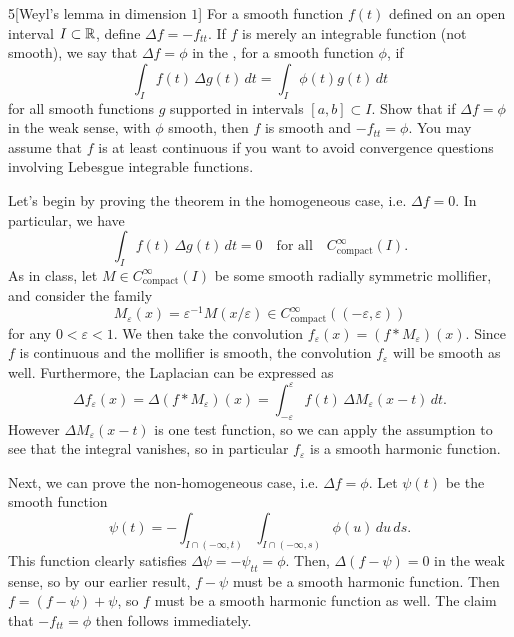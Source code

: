\documentclass[expanded]{lkx_pset}
\begin{document}
\begin{problem}{5}[Weyl's lemma in dimension $1$]
For a smooth function $f(t)$ defined on an open interval $I\subset \mathbb{R}$, define $\Delta f = -f_{tt}$. If $f$ is merely an integrable function (not smooth), we say that $\Delta f = \phi$ in the , for a smooth function $\phi$, if
\[
	\int_I f(t)\,\Delta g(t)\,dt = \int_I \phi(t)g(t)\,dt
\]
for all smooth functions $g$ supported in intervals $[a,b]\subset I$. Show that if $\Delta f = \phi$ in the weak sense, with $\phi$ smooth, then $f$ is smooth and $-f_{tt}=\phi$. You may assume that $f$ is at least continuous if you want to avoid convergence questions involving Lebesgue integrable functions.
\end{problem}

\begin{solution}
	Let's begin by proving the theorem in the homogeneous case, i.e. $\Delta f = 0$.
	In particular, we have
	\[
		\int_I f(t)\,\Delta g(t)\,dt = 0\quad\textrm{for all}\quad C^\infty_{\textrm{compact}}(I).
	\]
	As in class, let $M\in C^\infty_{\textrm{compact}}(I)$ be some smooth radially symmetric mollifier, and consider the family
	\[
		M_\varepsilon(x) = \varepsilon^{-1}M(x/\varepsilon) \in C^\infty_{\textrm{compact}}((-\varepsilon, \varepsilon))
	\]
	for any $0<\varepsilon < 1$. We then take the convolution $f_\varepsilon(x) = (f * M_\varepsilon)(x)$.
	Since $f$ is continuous and the mollifier is smooth, the convolution $f_\varepsilon$ will be smooth as well. Furthermore, the Laplacian can be expressed as
	\[
		\Delta f_\varepsilon(x) = \Delta (f * M_\varepsilon)(x) = \int_{-\varepsilon}^\varepsilon f(t)\,\Delta M_\varepsilon(x-t)\,dt.
	\]
	However $\Delta M_\varepsilon(x-t)$ is one test function, so we can apply the assumption to see that the integral vanishes, so in particular $f_\varepsilon$ is a smooth harmonic function.

	Next, we can prove the non-homogeneous case, i.e. $\Delta f = \phi$. Let $\psi(t)$ be the smooth function
	\[
		\psi(t) = -\int_{I\cap (-\infty, t)} \int_{I\cap (-\infty, s)} \phi(u)\,du\,ds.
	\]
	This function clearly satisfies $\Delta \psi = -\psi_{tt} = \phi$. Then, $\Delta(f-\psi)=0$ in the weak sense, so by our earlier result, $f-\psi$ must be a smooth harmonic function. Then $f = (f-\psi)+\psi$, so $f$ must be a smooth harmonic function as well. The claim that $-f_{tt}=\phi$ then follows immediately.
\end{solution}
\end{document}

